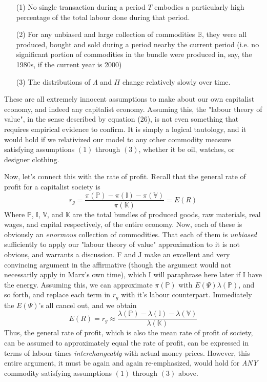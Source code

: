 \documentclass{article}
\theoremstyle{definition}
\theoremstyle{plain}
\theoremstyle{theorem}
\begin{document}
\begin{itemize}
	\item[(1)] No single transaction during a period $T$ embodies a particularly high percentage of the total labour done during that period.
	\item[(2)] For any unbiased and large collection of commodities $\mathbb{B}$, they were all produced, bought and sold during a period nearby the current period (i.e. no significant portion of commodities in the bundle were produced in, say, the 1980s, if the current year is 2000)
	\item[(3)] The distributions of $\Lambda$ and $\Pi$ change relatively slowly over time. 
\end{itemize}
These are all extremely innocent assumptions to make about our own capitalist economy, and indeed any capitalist economy. Assuming this, the "labour theory of value", in the sense described by equation (26), is not even something that requires empirical evidence to confirm. It is simply a logical tautology, and it would hold if we relativized our model to any other commodity measure satisfying assumptions $(1)$ through $(3)$, whether it be oil, watches, or designer clothing. \par 
Now, let's connect this with the rate of profit. Recall that the general rate of profit for a capitalist society is 
\[ r_g = \frac{\pi(\mathbb{P}) - \pi(\mathbb{I}) - \pi(\mathbb{V})}{\pi(\mathbb{K})} = E(R) \]
Where $\mathbb{P}$, $\mathbb{I}$, $\mathbb{V}$, and $\mathbb{K}$ are the total bundles of produced goods, raw materials, real wages, and capital respectively, of the entire economy. Now, each of these is obviously an \textit{enormous} collection of commodities. That each of them is \textit{unbiased} sufficiently to apply our "labour theory of value" approximation to it is not obvious, and warrants a discussion. F and J make an excellent and very convincing argument in the affirmative (though the argument would not necessarily apply in Marx's own time), which I will paraphrase here later if I have the energy. Assuming this, we can approximate $\pi(\mathbb{P})$ with $E(\Psi)\lambda(\mathbb{P})$, and so forth, and replace each term in $r_g$ with it's labour counterpart. Immediately the $E(\Psi)$'s all cancel out, and we obtain 
\[ E(R) = r_g \approx \frac{\lambda(\mathbb{P}) - \lambda(\mathbb{I}) - \lambda(\mathbb{V})}{\lambda(\mathbb{K})} \] 
Thus, the general rate of profit, which is also the mean rate of profit of society, can be assumed to approximately equal the rate of profit, can be expressed in terms of labour times \textit{interchangeably} with actual money prices.    
However, this entire argument, it must be again and again re-emphasized, would hold for \textit{ANY} commodity satisfying assumptions $(1)$ through $(3)$ above. 
\end{document}
